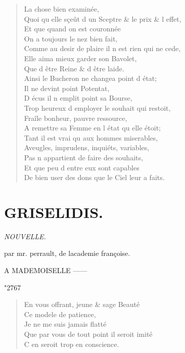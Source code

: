 \documentclass[14pt,a4paper]{memoir}
\newcommand{\spacer}{%
  \par\vspace{1\baselineskip}%
  \begin{center}%
    {\HUGE \char"2767}%
  \end{center}%
  \vspace{1\baselineskip}\par%
}
\begin{document}
{{\begin{otherlanguage}{french}
\begin{verse}
\vin La chose bien examinée, \\
Quoi qu\textquotesingle{} elle sçeût d\textquotesingle{} un Sceptre \& le prix \& l\textquotesingle{} effet, \\
\vin Et que quand on est couronnée \\
\vin On a toujours le nez bien fait, \\
Comme au desir de plaire il n\textquotesingle{} est rien qui ne cede, \\
\vin Elle aima mieux garder son Bavolet, \\
\vin Que d\textquotesingle{} être Reine \& d\textquotesingle{} être laide. \\
Ainsi le Bucheron ne changea point d\textquotesingle{} état; \\
\vin Il ne devint point Potentat, \\
\vin D\textquotesingle{} écus il n\textquotesingle{} emplit point sa Bourse, \\
Trop heureux d\textquotesingle{} employer le souhait qui restoit, \\
\vin Fraîle bonheur, pauvre ressource, \\
A remettre sa Femme en l\textquotesingle{} état qu\textquotesingle{} elle étoit; \\
\vin Tant il est vrai qu\textquotesingle{} aux hommes miserables, \\
Aveugles, imprudens, inquiéts, variables, \\
\vin Pas n\textquotesingle{} appartient de faire des souhaits, \\
\vin Et que peu d\textquotesingle{} entre eux sont capables \\
De bien user des dons que le Ciel leur a faits.
\end{verse}

\chapter{GRISELIDIS.}

\begin{flushright}
  \itshape
NOUVELLE.

par mr. perrault, de l\textquotesingle academie françoise.

A MADEMOISELLE ------
\end{flushright}

\spacer

\begin{verse}
En vous offrant, jeune \& sage Beauté \\
\vin Ce modele de patience, \\
\vin Je ne me suis jamais flatté \\
Que par vous de tout point il seroit imité \\
\vin C\textquotesingle{} en seroit trop en conscience.


\end{verse}
\end{otherlanguage}}}
\end{document}
